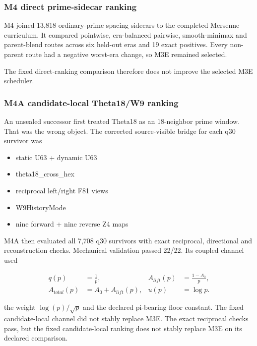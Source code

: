 \subsubsection{M4 direct prime-sidecar
ranking}\label{viii-ch10-m4-direct-prime-sidecar-ranking}

M4 joined 13,818 ordinary-prime spacing sidecars to the completed
Mersenne curriculum. It compared pointwise, era-balanced pairwise,
smooth-minimax and parent-blend routes across six held-out eras and 19
exact positives. Every non-parent route had a negative worst-era change,
so M3E remained selected.

The fixed direct-ranking comparison therefore does not improve the selected M3E scheduler.

\subsubsection{M4A candidate-local Theta18/W9
ranking}\label{viii-ch10-m4a-candidate-local-theta18w9-ranking}

An unsealed successor first treated Theta18 as an 18-neighbor prime
window. That was the wrong object. The corrected source-visible bridge
for each q30 survivor was

\begin{itemize}
\tightlist
\item
  static U63 + dynamic U63
\item
  theta18\_cross\_hex
\item
  reciprocal left/right F81 views
\item
  W9HistoryMode
\item
  nine forward + nine reverse Z4 maps
\end{itemize}

M4A then evaluated all 7,708 q30 survivors with exact reciprocal,
directional and reconstruction checks. Mechanical validation passed
22/22. Its coupled channel used

\[
\begin{aligned}
q(p)&=\frac1p,& A_{lift}(p)&=\frac{1-A_0}{p},\\
A_{total}(p)&=A_0+A_{lift}(p),&u(p)&=\log p.
\end{aligned}
\]

the weight \(\log(p)/\sqrt p\) and the declared pi-bearing floor
constant. The fixed candidate-local channel did not stably replace M3E.
The exact reciprocal checks pass, but the fixed candidate-local ranking does not stably replace M3E on its declared comparison.

